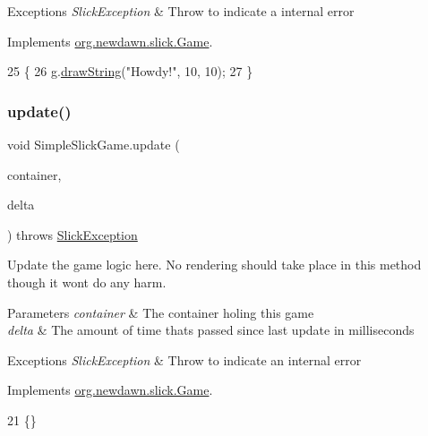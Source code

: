 \begin{DoxyExceptions}{Exceptions}
{\em Slick\+Exception} & Throw to indicate a internal error \\
\hline
\end{DoxyExceptions}


Implements \mbox{\hyperlink{interfaceorg_1_1newdawn_1_1slick_1_1_game_af1a4670d43eb3ba04dfcf55ab1975b64}{org.\+newdawn.\+slick.\+Game}}.


\begin{DoxyCode}
25     \{
26         g.\mbox{\hyperlink{classorg_1_1newdawn_1_1slick_1_1_graphics_a94021ab8d17140db411b6bb92f35ef31}{drawString}}(\textcolor{stringliteral}{"Howdy!"}, 10, 10);
27     \}
\end{DoxyCode}
\mbox{\label{class_simple_slick_game_aea7cb63494fc122b2de53f909910a2cd}} 
\subsubsection{\texorpdfstring{update()}{update()}}
{\footnotesize\ttfamily void Simple\+Slick\+Game.\+update (\begin{DoxyParamCaption}\item[{\mbox{\hyperlink{classorg_1_1newdawn_1_1slick_1_1_game_container}{Game\+Container}}}]{container,  }\item[{int}]{delta }\end{DoxyParamCaption}) throws \mbox{\hyperlink{classorg_1_1newdawn_1_1slick_1_1_slick_exception}{Slick\+Exception}}\hspace{0.3cm}{\ttfamily [inline]}}

Update the game logic here. No rendering should take place in this method though it won\textquotesingle{}t do any harm.


\begin{DoxyParams}{Parameters}
{\em container} & The container holing this game \\
\hline
{\em delta} & The amount of time thats passed since last update in milliseconds \\
\hline
\end{DoxyParams}

\begin{DoxyExceptions}{Exceptions}
{\em Slick\+Exception} & Throw to indicate an internal error \\
\hline
\end{DoxyExceptions}


Implements \mbox{\hyperlink{interfaceorg_1_1newdawn_1_1slick_1_1_game_ab07b2e9463ee4631620dde0de25bdee8}{org.\+newdawn.\+slick.\+Game}}.


\begin{DoxyCode}
21 \{\}
\end{DoxyCode}
